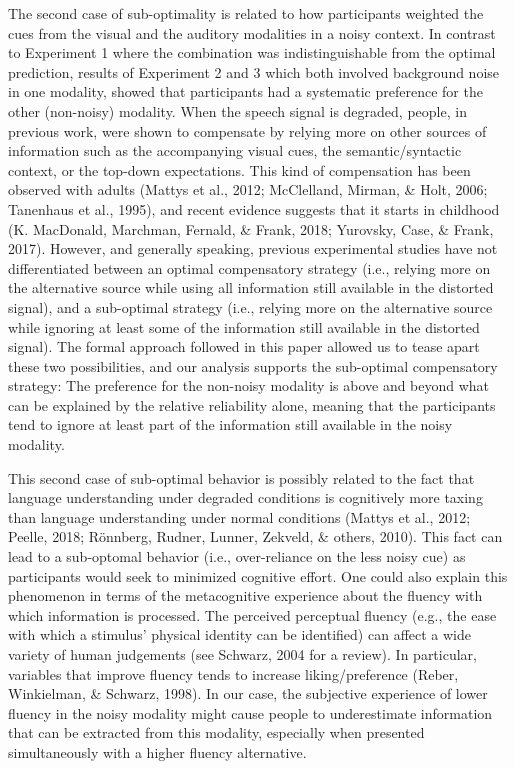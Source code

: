 \documentclass[english,floatsintext,man]{apa6}
\theoremstyle{definition}
\theoremstyle{definition}
\theoremstyle{definition}
\theoremstyle{remark}
\begin{document}
The second case of sub-optimality is related to how participants
weighted the cues from the visual and the auditory modalities in a noisy
context. In contrast to Experiment 1 where the combination was
indistinguishable from the optimal prediction, results of Experiment 2
and 3 which both involved background noise in one modality, showed that
participants had a systematic preference for the other (non-noisy)
modality. When the speech signal is degraded, people, in previous work,
were shown to compensate by relying more on other sources of information
such as the accompanying visual cues, the semantic/syntactic context, or
the top-down expectations. This kind of compensation has been observed
with adults (Mattys et al., 2012; McClelland, Mirman, \& Holt, 2006;
Tanenhaus et al., 1995), and recent evidence suggests that it starts in
childhood (K. MacDonald, Marchman, Fernald, \& Frank, 2018; Yurovsky,
Case, \& Frank, 2017). However, and generally speaking, previous
experimental studies have not differentiated between an optimal
compensatory strategy (i.e., relying more on the alternative source
while using all information still available in the distorted signal),
and a sub-optimal strategy (i.e., relying more on the alternative source
while ignoring at least some of the information still available in the
distorted signal). The formal approach followed in this paper allowed us
to tease apart these two possibilities, and our analysis supports the
sub-optimal compensatory strategy: The preference for the non-noisy
modality is above and beyond what can be explained by the relative
reliability alone, meaning that the participants tend to ignore at least
part of the information still available in the noisy modality.

This second case of sub-optimal behavior is possibly related to the fact
that language understanding under degraded conditions is cognitively
more taxing than language understanding under normal conditions (Mattys
et al., 2012; Peelle, 2018; Rönnberg, Rudner, Lunner, Zekveld, \&
others, 2010). This fact can lead to a sub-optomal behavior (i.e.,
over-reliance on the less noisy cue) as participants would seek to
minimized cognitive effort. One could also explain this phenomenon in
terms of the metacognitive experience about the fluency with which
information is processed. The perceived perceptual fluency (e.g., the
ease with which a stimulus' physical identity can be identified) can
affect a wide variety of human judgements (see Schwarz, 2004 for a
review). In particular, variables that improve fluency tends to increase
liking/preference (Reber, Winkielman, \& Schwarz, 1998). In our case,
the subjective experience of lower fluency in the noisy modality might
cause people to underestimate information that can be extracted from
this modality, especially when presented simultaneously with a higher
fluency alternative.
\end{document}
